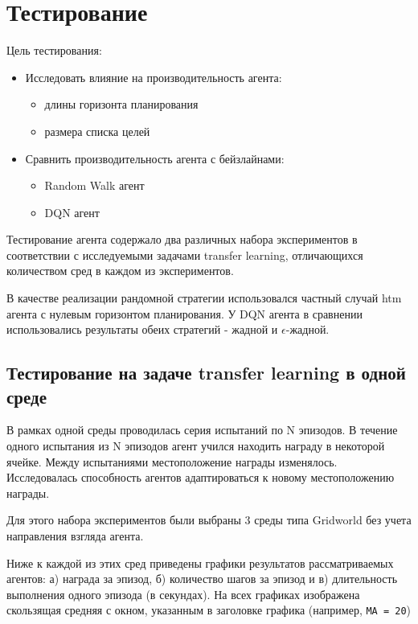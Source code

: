 \documentclass[a4paper]{article}
\begin{document}
\section{Тестирование}

Цель тестирования:

\begin{itemize}
    \item Исследовать влияние на производительность агента:
    \begin{itemize}
        \item длины горизонта планирования
        \item размера списка целей
    \end{itemize}
    
    \item Сравнить производительность агента с бейзлайнами:
    \begin{itemize}
        \item Random Walk агент
        \item DQN агент
    \end{itemize}
\end{itemize}

Тестирование агента содержало два различных набора экспериментов в соответствии с исследуемыми задачами transfer learning, отличающихся количеством сред в каждом из экспериментов.

В качестве реализации рандомной стратегии использовался частный случай htm агента с нулевым горизонтом планирования. У DQN агента в сравнении использовались результаты обеих стратегий - жадной и $\epsilon$-жадной.


\subsection{Тестирование на задаче transfer learning в одной среде}

В рамках одной среды проводилась серия испытаний по N эпизодов. В течение одного испытания из N эпизодов агент учился находить награду в некоторой ячейке. Между испытаниями местоположение награды изменялось. Исследовалась способность агентов адаптироваться к новому местоположению награды.

Для этого набора экспериментов были выбраны 3 среды типа Gridworld без учета направления взгляда агента.

Ниже к каждой из этих сред приведены графики результатов рассматриваемых агентов: а) награда за эпизод, б) количество шагов за эпизод и в) длительность выполнения одного эпизода (в секундах). На всех графиках изображена скользящая средняя с окном, указанным в заголовке графика (например, \verb|MA = 20|)
\end{document}
